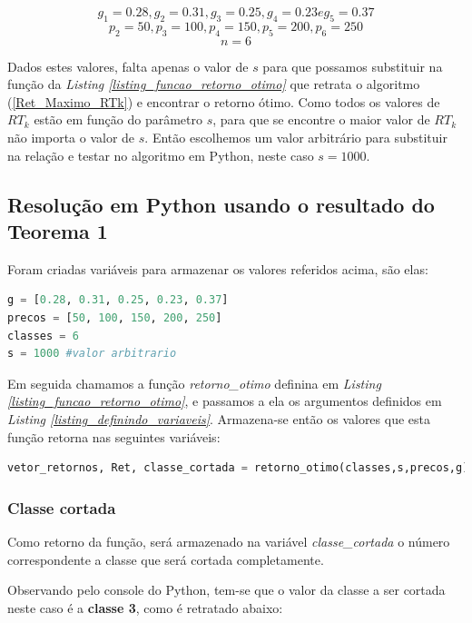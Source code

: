 \documentclass[a4paper, 12pt]{article}
\begin{document}
$$g_1=0.28, g_2=0.31, g_3=0.25, g_4=0.23 e g_5=0.37$$
$$p_2=50, p_3=100, p_4=150, p_5=200, p_6=250$$
$$n=6$$

Dados estes valores, falta apenas o valor de $s$ para que possamos substituir na função da \emph{Listing \ref{listing_funcao_retorno_otimo}}  que retrata o algoritmo (\ref{Ret_Maximo_RTk}) e encontrar o retorno ótimo. Como todos os valores de $RT_k$ estão em função do parâmetro $s$, para que se encontre o maior valor de $RT_k$ não importa o valor de $s$. Então escolhemos um valor arbitrário para substituir na relação e testar no algoritmo em Python, neste caso $s=1000$.


\subsection{Resolução em Python usando o resultado do Teorema 1}

Foram criadas variáveis para armazenar os valores referidos acima, são elas:

\begin{lstlisting}[language=Python, caption=Definindo os valores das variáveis, label=listing_definindo_variaveis]
g = [0.28, 0.31, 0.25, 0.23, 0.37]
precos = [50, 100, 150, 200, 250]
classes = 6
s = 1000 #valor arbitrario
\end{lstlisting}

Em seguida chamamos a função \emph{retorno\_otimo} definina em \emph{Listing \ref{listing_funcao_retorno_otimo}}, e passamos a ela os argumentos definidos em \emph{Listing \ref{listing_definindo_variaveis}}. Armazena-se então os valores que esta função retorna nas seguintes variáveis:

\begin{lstlisting}[language=Python, caption=Chamando a função \emph{retorno\_otimo} e armazenando retornos, label=listing_chamada_retorno_otimo_2]
vetor_retornos, Ret, classe_cortada = retorno_otimo(classes,s,precos,g)
\end{lstlisting}

\subsubsection{Classe cortada}

Como retorno da função, será armazenado na variável \emph{classe\_cortada} o número correspondente a classe que será cortada completamente.

Observando pelo console do Python, tem-se que o valor da classe a ser cortada neste caso é a \textbf{classe 3}, como é retratado abaixo:
\end{document}
